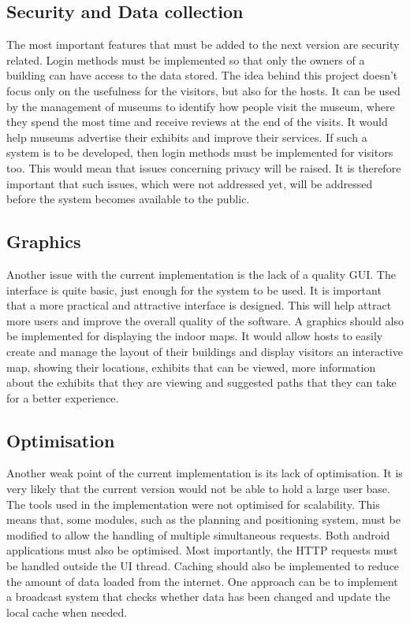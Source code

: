 \subsection{Security and Data collection}
The most important features that must be added to the next version are security related. Login methods must be implemented so that only the owners of a building can have access to the data stored. The idea behind this project doesn’t focus only on the usefulness for the visitors, but also for the hosts. It can be used by the management of museums to identify how people visit the museum, where they spend the most time and receive reviews at the end of the visits. It would help museums advertise their exhibits and improve their services. If such a system is to be developed, then login methods must be implemented for visitors too. This would mean that issues concerning privacy will be raised. It is therefore important that such issues, which were not addressed yet, will be addressed before the system becomes available to the public. 

\subsection{Graphics}
Another issue with the current implementation is the lack of a quality GUI. The interface is quite basic, just enough for the system to be used. It is important that a more practical and attractive interface is designed. This will help attract more users and improve the overall quality of the software. A graphics should also be implemented for displaying the indoor maps. It would allow hosts to easily create and manage the layout of their buildings and display visitors an interactive map, showing their locations, exhibits that can be viewed, more information about the exhibits that they are viewing and suggested paths that they can take for a better experience. 

\subsection{Optimisation}
Another weak point of the current implementation is its lack of optimisation. It is very likely that the current version would not be able to hold a large user base. The tools used in the implementation were not optimised for scalability. This means that, some modules, such as the planning and positioning system, must be modified to allow the handling of multiple simultaneous requests. Both android applications must also be optimised. Most importantly, the HTTP requests must be handled outside the UI thread. Caching should also be implemented to reduce the amount of data loaded from the internet. One approach can be to implement a broadcast system that checks whether data has been changed and update the local cache when needed.

